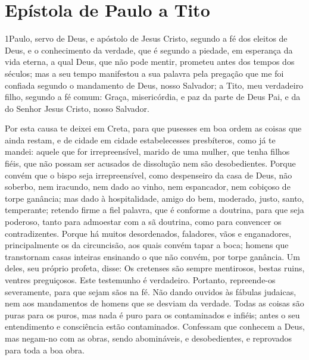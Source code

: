 \thispagestyle{empty}
\chapter*{Epístola de Paulo a Tito}

\lettrine{1} Paulo, servo de Deus, e apóstolo de Jesus Cristo,
segundo a fé dos eleitos de Deus, e o conhecimento da verdade, que é
segundo a piedade, em esperança da vida eterna, a qual Deus, que
não pode mentir, prometeu antes dos tempos dos séculos; mas a
seu tempo manifestou a sua palavra pela pregação que me foi confiada
segundo o mandamento de Deus, nosso Salvador; a Tito, meu
verdadeiro filho, segundo a fé comum: Graça, misericórdia, e paz da
parte de Deus Pai, e da do Senhor Jesus Cristo, nosso Salvador.

Por esta causa te deixei em Creta, para que pusesses em boa ordem
as coisas que ainda restam, e de cidade em cidade estabelecesses
presbíteros, como já te mandei: aquele que for irrepreensível,
marido de uma mulher, que tenha filhos fiéis, que não possam ser
acusados de dissolução nem são desobedientes. Porque convém que
o bispo seja irrepreensível, como despenseiro da casa de Deus, não
soberbo, nem iracundo, nem dado ao vinho, nem espancador, nem
cobiçoso de torpe ganância; mas dado à hospitalidade, amigo do
bem, moderado, justo, santo, temperante; retendo firme a fiel
palavra, que é conforme a doutrina, para que seja poderoso, tanto
para admoestar com a sã doutrina, como para convencer os
contradizentes. Porque há muitos desordenados, faladores,
vãos e enganadores, principalmente os da circuncisão, aos
quais convém tapar a boca; homens que transtornam casas inteiras
ensinando o que não convém, por torpe ganância. Um deles, seu
próprio profeta, disse: Os cretenses são sempre mentirosos, bestas
ruins, ventres preguiçosos. Este testemunho é verdadeiro.
Portanto, repreende-os severamente, para que sejam sãos na fé.
Não dando ouvidos às fábulas judaicas, nem aos mandamentos de
homens que se desviam da verdade. Todas as coisas são puras
para os puros, mas nada é puro para os contaminados e infiéis; antes
o seu entendimento e consciência estão contaminados.
Confessam que conhecem a Deus, mas negam-no com as obras,
sendo abomináveis, e desobedientes, e reprovados para toda a boa
obra.

\medskip

